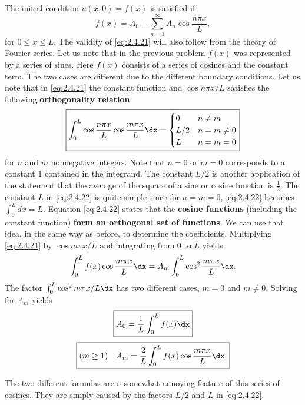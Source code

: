The initial condition $u(x,0) = f(x)$ is satisfied if
\begin{equation}
\label{eq:2.4.21}
\boxed{f(x) = A_0 + \sum_{n=1}^{\infty} A_n\cos\frac{n\pi x}{L},}
\end{equation}
for $0 \le x \le L$. The validity of \eqref{eq:2.4.21} will also follow from the theory of Fourier series. Let us note that in the previous problem $f(x)$ was represented by a series of sines. Here $f(x)$ consists of a series of cosines and the constant term. The two cases are different due to the different boundary conditions. Let us note that in \eqref{eq:2.4.21} the constant function and $\cos n\pi x/L$ satisfies the following \textbf{orthogonality relation}:
\begin{equation}
\label{eq:2.4.22}
\boxed{\int_0^L \cos\frac{n\pi x}{L}\cos\frac{m\pi x}{L}\dx = \begin{cases} 0 & n \ne m \\ L/2 & n = m \ne 0 \\ L & n = m = 0 \end{cases}}
\end{equation}
for $n$ and $m$ nonnegative integers. Note that $n = 0$ or $m = 0$ corresponds to a constant 1 contained in the integrand. The constant $L/2$ is another application of the statement that the average of the square of a sine or cosine function is $\frac{1}{2}$. The constant $L$ in \eqref{eq:2.4.22} is quite simple since for $n = m = 0$, \eqref{eq:2.4.22} becomes $\int_0^L dx = L$. Equation \eqref{eq:2.4.22} states that the \textbf{cosine functions} (including the constant function) \textbf{form an orthogonal set of functions}. We can use that idea, in the same way as before, to determine the coefficients. Multiplying \eqref{eq:2.4.21} by $\cos m\pi x/L$ and integrating from $0$ to $L$ yields
\[
\int_0^L f(x)\cos\frac{m\pi x}{L}\dx = A_m \int_0^L \cos^2\frac{m\pi x}{L}\dx.
\]
The factor $\int_0^L \cos^2 m\pi x/L\dx$ has two different cases, $m = 0$ and $m \ne 0$. Solving for $A_m$ yields
\begin{equation}
\label{eq:2.4.23}
\boxed{A_0 = \frac{1}{L}\int_0^L f(x)\dx}
\end{equation}
\begin{equation}
\label{eq:2.4.24}
\boxed{(m \ge 1)\quad A_m = \frac{2}{L}\int_0^L f(x)\cos\frac{m\pi x}{L}\dx.}
\end{equation}

The two different formulas are a somewhat annoying feature of this series of cosines. They are simply caused by the factors $L/2$ and $L$ in \eqref{eq:2.4.22}.

